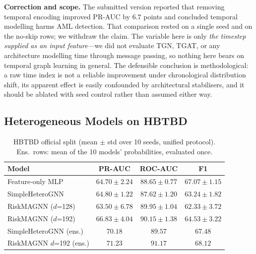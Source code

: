 \documentclass[conference]{IEEEtran}
\begin{document}
\textbf{Correction and scope.} The submitted version reported that removing
temporal encoding improved PR-AUC by $6.7$ points and concluded temporal
modelling harms AML detection. That comparison rested on a single seed and on
the no-skip rows; we withdraw the claim. The variable here is only \emph{the
timestep supplied as an input feature}---we did not evaluate TGN, TGAT, or
any architecture modelling time through message passing, so nothing here
bears on temporal graph learning in general. The defensible conclusion is
methodological: a raw time index is not a reliable improvement under
chronological distribution shift, its apparent effect is easily confounded by
architectural stabilisers, and it should be ablated with seed control rather
than assumed either way.

\subsection{Heterogeneous Models on HBTBD}

\begin{table}[t]
\caption{HBTBD official split (mean $\pm$ std over 10 seeds, unified
protocol). Ens.\ rows: mean of the 10 models' probabilities, evaluated once.}
\label{tab:hbtbd}
\centering
\footnotesize
\setlength{\tabcolsep}{2.5pt}
\begin{tabular}{lccc}
\toprule
\textbf{Model} & \textbf{PR-AUC} & \textbf{ROC-AUC} & \textbf{F1} \\
\midrule
Feature-only MLP    & $64.70 \pm 2.24$ & $88.65 \pm 0.77$ & $67.07 \pm 1.15$ \\
SimpleHeteroGNN     & $64.80 \pm 1.22$ & $87.62 \pm 1.20$ & $63.24 \pm 1.82$ \\
RiskMAGNN ($d$=128) & $63.50 \pm 6.78$ & $89.95 \pm 1.04$ & $62.33 \pm 3.72$ \\
RiskMAGNN ($d$=192) & $66.83 \pm 4.04$ & $90.15 \pm 1.38$ & $64.53 \pm 3.22$ \\
\midrule
SimpleHeteroGNN (ens.) & $70.18$ & $89.57$ & $67.48$ \\
RiskMAGNN $d$=192 (ens.) & $\mathbf{71.23}$ & $\mathbf{91.17}$ & $\mathbf{68.12}$ \\
\bottomrule
\end{tabular}
\end{table}
\end{document}
